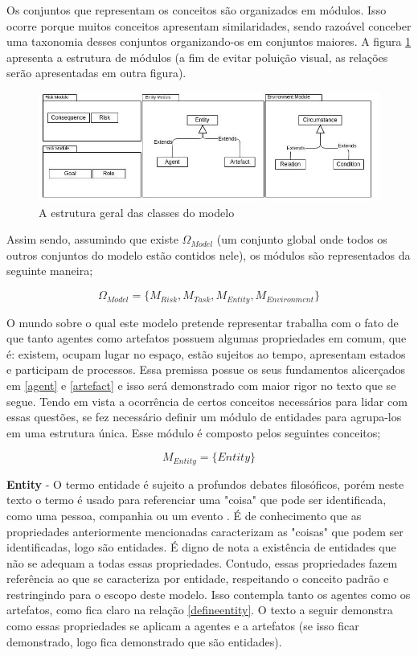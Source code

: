 Os conjuntos que representam os conceitos são organizados em  módulos. Isso ocorre porque muitos conceitos apresentam similaridades, sendo razoável conceber uma taxonomia desses conjuntos organizando-os em conjuntos maiores. A figura \ref{module} apresenta a estrutura de módulos (a fim de evitar poluição visual, as relações serão apresentadas em outra figura). 

\begin{figure}[H]
  \centering
  \includegraphics[width=1\linewidth]{figure/Module.jpeg} 
  \caption{A estrutura geral das classes do modelo}
  \label{module}
\end{figure}

Assim sendo, assumindo que existe $\Omega_{Model}$ (um conjunto global onde todos os outros conjuntos do modelo estão contidos nele), os módulos são representados da seguinte maneira; 

\begin{equation} 
    \Omega_{Model} = \{ M_{Risk}, M_{Task}, M_{Entity}, M_{Environment}\}
\end{equation}
\label{modules}


O mundo sobre o qual este modelo pretende representar trabalha com o fato de que tanto agentes como artefatos possuem algumas propriedades em comum, que é: existem, ocupam lugar no espaço, estão sujeitos ao tempo, apresentam estados e participam de processos. Essa premissa possue os seus fundamentos alicerçados em \ref{agent} e \ref{artefact} e isso será demonstrado com maior rigor no texto que se segue. Tendo em vista a ocorrência de certos conceitos necessários para lidar com essas questões, se fez necessário definir um módulo de entidades para agrupa-los em uma estrutura única. Esse módulo é composto pelos seguintes conceitos;

\begin{equation} 
M_{Entity} = \{ Entity \}
\end{equation}\label{modent}

\textbf{Entity} - O termo entidade é sujeito a profundos debates filosóficos, porém neste texto o termo é usado para referenciar uma "coisa" que pode ser identificada, como uma pessoa, companhia ou um evento \cite{entity}. É de conhecimento que as propriedades anteriormente mencionadas caracterizam as "coisas" que podem ser identificadas, logo são entidades. É digno de nota a existência de entidades que não se adequam a todas essas propriedades. Contudo, essas propriedades fazem referência ao que se caracteriza por entidade, respeitando o conceito padrão \cite{entity} e restringindo para o escopo deste modelo. Isso contempla tanto os agentes como os artefatos, como fica claro na relação \ref{defineentity}. O texto a seguir demonstra como essas propriedades se aplicam a agentes e a artefatos (se isso ficar demonstrado, logo fica demonstrado que são entidades).

